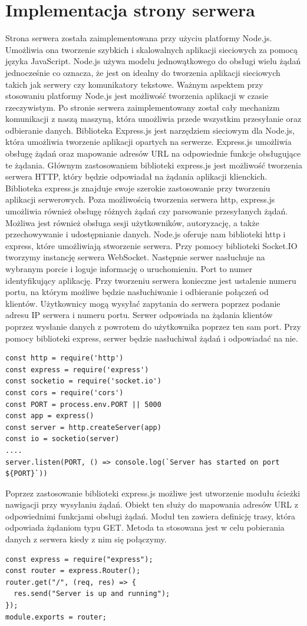 \section{Implementacja strony serwera}
Strona serwera została zaimplementowana przy użyciu platformy Node.js. Umożliwia ona tworzenie szybkich i skalowalnych aplikacji sieciowych za pomocą języka JavaScript. Node.js używa modelu jednowątkowego do obsługi wielu żądań jednocześnie co oznacza, że jest on idealny do tworzenia aplikacji sieciowych takich jak serwery czy komunikatory tekstowe. Ważnym aspektem przy stosowaniu platformy Node.js jest możliwość tworzenia aplikacji w czasie rzeczywistym. Po stronie serwera zaimplementowany został cały mechanizm komunikacji z naszą maszyną, która umożliwia przede wszystkim przesyłanie oraz odbieranie danych.
Biblioteka Express.js  jest narzędziem sieciowym dla Node.js, która umożliwia tworzenie aplikacji opartych na serwerze. Express.js umożliwia obsługę żądań oraz mapowanie adresów URL na odpowiednie funkcje obsługujące te żądania. Głównym zastosowaniem biblioteki express.js jest możliwość tworzenia serwera HTTP, który będzie odpowiadał na żądania aplikacji klienckich. Biblioteka express.js znajduje swoje szerokie zastosowanie przy tworzeniu aplikacji serwerowych. Poza możliwością tworzenia serwera http, express.js umożliwia również obsługę różnych żądań czy parsowanie przesyłanych żądań. Możliwa jest również obsługa sesji użytkowników, autoryzację, a także przechowywanie i udostępnianie danych.
Node.js oferuje nam biblioteki http i express, które umożliwiają stworzenie serwera. Przy pomocy biblioteki Socket.IO tworzymy instancję serwera WebSocket. Następnie serwer nasłuchuje na wybranym porcie i loguje informację o uruchomieniu. Port to numer identyfikujący aplikację. Przy tworzeniu serwera konieczne jest ustalenie numeru portu, na którym możliwe będzie nasłuchiwanie i odbieranie połączeń od klientów. Użytkownicy mogą wysyłać zapytania do serwera poprzez podanie adresu IP serwera i numeru portu. Serwer odpowiada na żądania klientów poprzez wysłanie danych z powrotem do użytkownika poprzez ten sam port. Przy pomocy biblioteki express, serwer będzie nasłuchiwał żądań i odpowiadać na nie. 
\begin{lstlisting}[caption=Implementacja serwera]
const http = require('http')
const express = require('express')
const socketio = require('socket.io')
const cors = require('cors')
const PORT = process.env.PORT || 5000
const app = express()
const server = http.createServer(app)
const io = socketio(server)
....
server.listen(PORT, () => console.log(`Server has started on port ${PORT}`))
\end{lstlisting}
Poprzez zastosowanie biblioteki express.js możliwe jest utworzenie modułu ścieżki nawigacji przy wysyłaniu żądań. Obiekt ten służy do mapowania adresów URL z odpowiednimi funkcjami obsługi żądań. Moduł ten zawiera definicję trasy, która odpowiada żądaniom typu GET. Metoda ta stosowana jest w celu pobierania danych z serwera kiedy z nim się połączymy.
\begin{lstlisting}[caption=Implementacja sciezki serwera]
const express = require("express");
const router = express.Router();
router.get("/", (req, res) => {
  res.send("Server is up and running");
});
module.exports = router;
\end{lstlisting}
